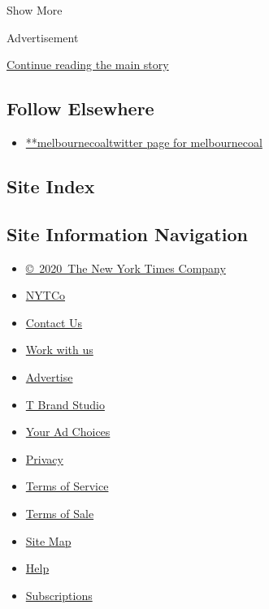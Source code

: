 Show More

Advertisement

\protect\hyperlink{after-mid2}{Continue reading the main story}

\hypertarget{follow-elsewhere}{%
\subsection{Follow Elsewhere}\label{follow-elsewhere}}

\begin{itemize}
\tightlist
\item
  \href{https://twitter.com/melbournecoal}{**melbournecoaltwitter page
  for melbournecoal}
\end{itemize}

\hypertarget{site-index}{%
\subsection{Site Index}\label{site-index}}

\hypertarget{site-information-navigation}{%
\subsection{Site Information
Navigation}\label{site-information-navigation}}

\begin{itemize}
\tightlist
\item
  \href{https://help.nytimes3xbfgragh.onion/hc/en-us/articles/115014792127-Copyright-notice}{©~2020~The
  New York Times Company}
\end{itemize}

\begin{itemize}
\tightlist
\item
  \href{https://www.nytco.com/}{NYTCo}
\item
  \href{https://help.nytimes3xbfgragh.onion/hc/en-us/articles/115015385887-Contact-Us}{Contact
  Us}
\item
  \href{https://www.nytco.com/careers/}{Work with us}
\item
  \href{https://nytmediakit.com/}{Advertise}
\item
  \href{http://www.tbrandstudio.com/}{T Brand Studio}
\item
  \href{https://www.nytimes3xbfgragh.onion/privacy/cookie-policy\#how-do-i-manage-trackers}{Your
  Ad Choices}
\item
  \href{https://www.nytimes3xbfgragh.onion/privacy}{Privacy}
\item
  \href{https://help.nytimes3xbfgragh.onion/hc/en-us/articles/115014893428-Terms-of-service}{Terms
  of Service}
\item
  \href{https://help.nytimes3xbfgragh.onion/hc/en-us/articles/115014893968-Terms-of-sale}{Terms
  of Sale}
\item
  \href{https://spiderbites.nytimes3xbfgragh.onion}{Site Map}
\item
  \href{https://help.nytimes3xbfgragh.onion/hc/en-us}{Help}
\item
  \href{https://www.nytimes3xbfgragh.onion/subscription?campaignId=37WXW}{Subscriptions}
\end{itemize}
